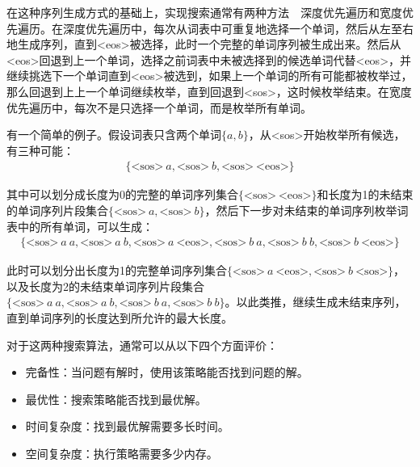 \parinterval 在这种序列生成方式的基础上，实现搜索通常有两种方法\ \dash\ 深度优先遍历和宽度优先遍历。在深度优先遍历中，每次从词表中可重复地选择一个单词，然后从左至右地生成序列，直到<eos>被选择，此时一个完整的单词序列被生成出来。然后从<eos>回退到上一个单词，选择之前词表中未被选择到的候选单词代替<eos>，并继续挑选下一个单词直到<eos>被选到，如果上一个单词的所有可能都被枚举过，那么回退到上上一个单词继续枚举，直到回退到<sos>，这时候枚举结束。在宽度优先遍历中，每次不是只选择一个单词，而是枚举所有单词。

\parinterval 有一个简单的例子。假设词表只含两个单词$\{a, b\}$，从<sos>开始枚举所有候选，有三种可能：
\begin{eqnarray}
\{\text{<sos>}\ a, \text{<sos>}\ b, \text{<sos>}\ \text{<eos>}\} \nonumber
\end{eqnarray}

\noindent 其中可以划分成长度为0的完整的单词序列集合$\{\text{<sos>}\ \text{<eos>}\}$和长度为1的未结束的单词序列片段集合$\{\text{<sos>}\ a, \text{<sos>}\ b\}$，然后下一步对未结束的单词序列枚举词表中的所有单词，可以生成：
\begin{eqnarray}
\{\text{<sos>}\ a\ a, \text{<sos>}\ a\ b, \text{<sos>}\ a\ \text{<eos>}, \text{<sos>}\ b\ a, \text{<sos>}\ b\ b, \text{<sos>}\ b\ \text{<eos>}\} \nonumber
\end{eqnarray}

\parinterval 此时可以划分出长度为1的完整单词序列集合$\{\text{<sos>}\ a\ \text{<eos>}, \text{<sos>}\ b\ \text{<sos>}\}$，以及长度为2的未结束单词序列片段集合$\{\text{<sos>}\ a\ a, \text{<sos>}\ a\ b, \text{<sos>}\ b\ a, \text{<sos>}\ b\ b\}$。以此类推，继续生成未结束序列，直到单词序列的长度达到所允许的最大长度。

\parinterval 对于这两种搜索算法，通常可以从以下四个方面评价：

\begin{itemize}
\vspace{0.5em}
\item 完备性：当问题有解时，使用该策略能否找到问题的解。
\vspace{0.5em}
\item 最优性：搜索策略能否找到最优解。
\vspace{0.5em}
\item 时间复杂度：找到最优解需要多长时间。
\vspace{0.5em}
\item 空间复杂度：执行策略需要多少内存。
\vspace{0.5em}
\end{itemize}

